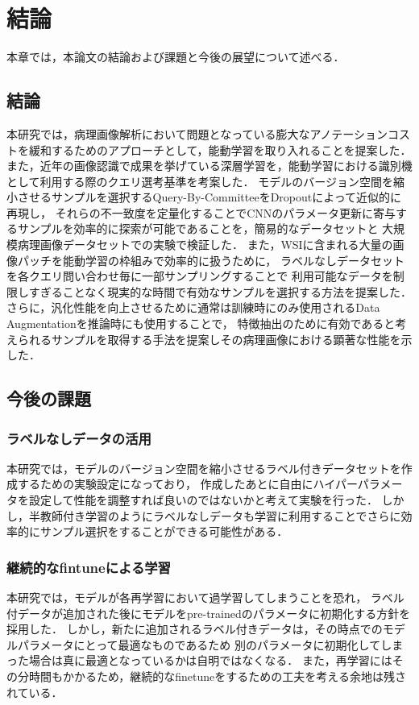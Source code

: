 \chapter{結論}
本章では，本論文の結論および課題と今後の展望について述べる．

\section{結論}
本研究では，病理画像解析において問題となっている膨大なアノテーションコストを緩和するためのアプローチとして，能動学習を取り入れることを提案した．
また，近年の画像認識で成果を挙げている深層学習を，能動学習における識別機として利用する際のクエリ選考基準を考案した．
モデルのバージョン空間を縮小させるサンプルを選択するQuery-By-CommitteeをDropoutによって近似的に再現し，
それらの不一致度を定量化することでCNNのパラメータ更新に寄与するサンプルを効率的に探索が可能であることを，簡易的なデータセットと
大規模病理画像データセットでの実験で検証した．
また，WSIに含まれる大量の画像パッチを能動学習の枠組みで効率的に扱うために，
ラベルなしデータセットを各クエリ問い合わせ毎に一部サンプリングすることで
利用可能なデータを制限しすぎることなく現実的な時間で有効なサンプルを選択する方法を提案した．
さらに，汎化性能を向上させるために通常は訓練時にのみ使用されるData Augmentationを推論時にも使用することで，
特徴抽出のために有効であると考えられるサンプルを取得する手法を提案しその病理画像における顕著な性能を示した．


\section{今後の課題}

\subsection{ラベルなしデータの活用}
本研究では，モデルのバージョン空間を縮小させるラベル付きデータセットを作成するための実験設定になっており，
作成したあとに自由にハイパーパラメータを設定して性能を調整すれば良いのではないかと考えて実験を行った．
しかし，半教師付き学習のようにラベルなしデータも学習に利用することでさらに効率的にサンプル選択をすることができる可能性がある．

\subsection{継続的なfintuneによる学習}
本研究では，モデルが各再学習において過学習してしまうことを恐れ，
ラベル付データが追加された後にモデルをpre-trainedのパラメータに初期化する方針を採用した．
しかし，新たに追加されるラベル付きデータは，その時点でのモデルパラメータにとって最適なものであるため
別のパラメータに初期化してしまった場合は真に最適となっているかは自明ではなくなる．
また，再学習にはその分時間もかかるため，継続的なfinetuneをするための工夫を考える余地は残されている．

